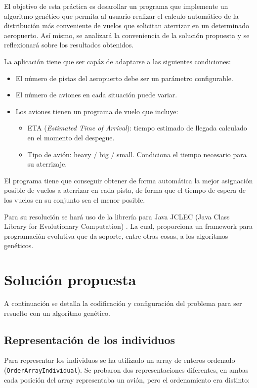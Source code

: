 \documentclass[a4paper,12pt,titlepage]{article}
\begin{document}
El objetivo de esta práctica es desarollar un programa que implemente un algoritmo genético que permita al usuario realizar el calculo automático de la distribución
más conveniente de vuelos que solicitan aterrizar en un determinado aeropuerto. Así mismo, se analizará la conveniencia de la solución propuesta y se reflexionará sobre los resultados obtenidos.

La aplicación tiene que ser capáz de adaptarse a las siguientes condiciones:

\begin{itemize}[noitemsep]
	\item El número de pistas del aeropuerto debe ser un parámetro configurable.
	\item El número de aviones en cada situación puede variar.
	\item Los aviones tienen un programa de vuelo que incluye:
	\begin{itemize}[noitemsep]
		\item ETA (\textit{Estimated Time of Arrival}): tiempo estimado de llegada calculado en el momento del despegue.
		\item Tipo de avión: heavy / big / small. Condiciona el tiempo necesario para su aterrizaje.
	\end{itemize}
\end{itemize}

El programa tiene que conseguir obtener de forma automática la mejor asignación posible de vuelos a aterrizar en cada pista, de forma que el tiempo de espera de los vuelos en su conjunto sea el menor posible.

Para su resolución se hará uso de la librería para Java JCLEC (Java Class Library for Evolutionary Computation) \citep{web:jclec}. La cual, proporciona un framework para programación evolutiva que da soporte, entre otras cosas, a los algoritmos genéticos.

\section{Solución propuesta}

A continuación se detalla la codificación y configuración del problema para ser resuelto con un algoritmo genético.

\subsection{Representación de los individuos}

Para representar los individuos se ha utilizado un array de enteros ordenado (\lstinline|OrderArrayIndividual|). Se probaron dos representaciones diferentes, en ambas cada posición del array representaba un avión, pero el ordenamiento era distinto:
\end{document}
